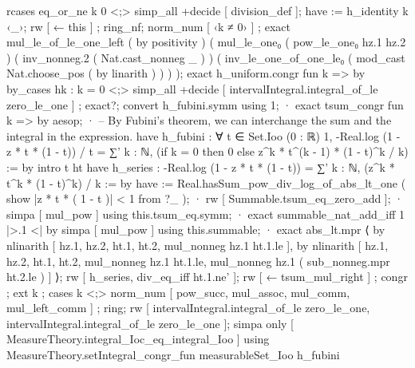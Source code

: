             rcases eq_or_ne k 0 <;> simp_all +decide [ division_def ];
            have := h_identity k ‹_›; rw [ ← this ] ; ring_nf; norm_num [ ‹k ≠ 0› ] ;
            exact mul_le_of_le_one_left ( by positivity ) ( mul_le_one₀ ( pow_le_one₀ hz.1 hz.2 ) ( inv_nonneg.2 ( Nat.cast_nonneg _ ) ) ( inv_le_one_of_one_le₀ ( mod_cast Nat.choose_pos ( by linarith ) ) ) );
          exact h_uniform.congr fun k => by by_cases hk : k = 0 <;> simp_all +decide [ intervalIntegral.integral_of_le zero_le_one ] ;
        exact?;
  convert h_fubini.symm using 1;
  · exact tsum_congr fun k => by aesop;
  · -- By Fubini's theorem, we can interchange the sum and the integral in the expression.
    have h_fubini : ∀ t ∈ Set.Ioo (0 : ℝ) 1, -Real.log (1 - z * t * (1 - t)) / t = ∑' k : ℕ, (if k = 0 then 0 else z^k * t^(k - 1) * (1 - t)^k / k) := by
      intro t ht
      have h_series : -Real.log (1 - z * t * (1 - t)) = ∑' k : ℕ, (z^k * t^k * (1 - t)^k) / k := by
        have := Real.hasSum_pow_div_log_of_abs_lt_one ( show |z * t * ( 1 - t )| < 1 from ?_ );
        · rw [ Summable.tsum_eq_zero_add ];
          · simpa [ mul_pow ] using this.tsum_eq.symm;
          · exact summable_nat_add_iff 1 |>.1 <| by simpa [ mul_pow ] using this.summable;
        · exact abs_lt.mpr ⟨ by nlinarith [ hz.1, hz.2, ht.1, ht.2, mul_nonneg hz.1 ht.1.le ], by nlinarith [ hz.1, hz.2, ht.1, ht.2, mul_nonneg hz.1 ht.1.le, mul_nonneg hz.1 ( sub_nonneg.mpr ht.2.le ) ] ⟩;
      rw [ h_series, div_eq_iff ht.1.ne' ];
      rw [ ← tsum_mul_right ] ; congr ; ext k ; cases k <;> norm_num [ pow_succ, mul_assoc, mul_comm, mul_left_comm ] ; ring;
    rw [ intervalIntegral.integral_of_le zero_le_one, intervalIntegral.integral_of_le zero_le_one ];
    simpa only [ MeasureTheory.integral_Ioc_eq_integral_Ioo ] using MeasureTheory.setIntegral_congr_fun measurableSet_Ioo h_fubini

